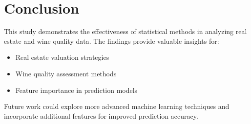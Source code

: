 \section{Conclusion}
This study demonstrates the effectiveness of statistical methods in analyzing real estate and wine quality data. The findings provide valuable insights for:
\begin{itemize}
    \item Real estate valuation strategies
    \item Wine quality assessment methods
    \item Feature importance in prediction models
\end{itemize}

Future work could explore more advanced machine learning techniques and incorporate additional features for improved prediction accuracy. 